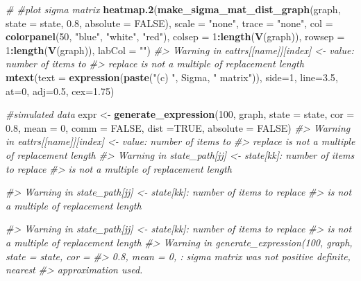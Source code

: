 \documentclass[]{article}
\newenvironment{Shaded}{\begin{snugshade}}{\end{snugshade}}
\newcommand{\CommentTok}[1]{\textcolor[rgb]{0.56,0.35,0.01}{\textit{#1}}}
\newcommand{\DataTypeTok}[1]{\textcolor[rgb]{0.13,0.29,0.53}{#1}}
\newcommand{\DecValTok}[1]{\textcolor[rgb]{0.00,0.00,0.81}{#1}}
\newcommand{\FloatTok}[1]{\textcolor[rgb]{0.00,0.00,0.81}{#1}}
\newcommand{\KeywordTok}[1]{\textcolor[rgb]{0.13,0.29,0.53}{\textbf{#1}}}
\newcommand{\NormalTok}[1]{#1}
\newcommand{\OperatorTok}[1]{\textcolor[rgb]{0.81,0.36,0.00}{\textbf{#1}}}
\newcommand{\OtherTok}[1]{\textcolor[rgb]{0.56,0.35,0.01}{#1}}
\newcommand{\StringTok}[1]{\textcolor[rgb]{0.31,0.60,0.02}{#1}}
\begin{document}
\begin{Shaded}
\begin{Highlighting}[]
{\CommentTok{# #plot sigma matrix}
\KeywordTok{heatmap.2}\NormalTok{(}\KeywordTok{make_sigma_mat_dist_graph}\NormalTok{(graph, }\DataTypeTok{state =}\NormalTok{ state, }\FloatTok{0.8}\NormalTok{, }\DataTypeTok{absolute =} \OtherTok{FALSE}\NormalTok{),}
\DataTypeTok{scale =} \StringTok{"none"}\NormalTok{, }\DataTypeTok{trace =} \StringTok{"none"}\NormalTok{, }\DataTypeTok{col =} \KeywordTok{colorpanel}\NormalTok{(}\DecValTok{50}\NormalTok{, }\StringTok{"blue"}\NormalTok{, }\StringTok{"white"}\NormalTok{, }\StringTok{"red"}\NormalTok{),}
\DataTypeTok{colsep =} \DecValTok{1}\OperatorTok{:}\KeywordTok{length}\NormalTok{(}\KeywordTok{V}\NormalTok{(graph)), }\DataTypeTok{rowsep =} \DecValTok{1}\OperatorTok{:}\KeywordTok{length}\NormalTok{(}\KeywordTok{V}\NormalTok{(graph)), }\DataTypeTok{labCol =} \StringTok{""}\NormalTok{)}
\CommentTok{#> Warning in eattrs[[name]][index] <- value: number of items to}
\CommentTok{#> replace is not a multiple of replacement length}
\KeywordTok{mtext}\NormalTok{(}\DataTypeTok{text =} \KeywordTok{expression}\NormalTok{(}\KeywordTok{paste}\NormalTok{(}\StringTok{"(c) "}\NormalTok{, Sigma, }\StringTok{" matrix"}\NormalTok{)), }\DataTypeTok{side=}\DecValTok{1}\NormalTok{, }\DataTypeTok{line=}\FloatTok{3.5}\NormalTok{, }\DataTypeTok{at=}\DecValTok{0}\NormalTok{, }\DataTypeTok{adj=}\FloatTok{0.5}\NormalTok{, }\DataTypeTok{cex=}\FloatTok{1.75}\NormalTok{)}

\CommentTok{#simulated data}
\NormalTok{expr <-}\StringTok{ }\KeywordTok{generate_expression}\NormalTok{(}\DecValTok{100}\NormalTok{, graph,  }\DataTypeTok{state =}\NormalTok{ state, }\DataTypeTok{cor =} \FloatTok{0.8}\NormalTok{, }\DataTypeTok{mean =} \DecValTok{0}\NormalTok{,}
\DataTypeTok{comm =} \OtherTok{FALSE}\NormalTok{, }\DataTypeTok{dist =}\OtherTok{TRUE}\NormalTok{, }\DataTypeTok{absolute =} \OtherTok{FALSE}\NormalTok{)}
\CommentTok{#> Warning in eattrs[[name]][index] <- value: number of items to}
\CommentTok{#> replace is not a multiple of replacement length}
\CommentTok{#> Warning in state_path[jj] <- state[kk]: number of items to replace}
\CommentTok{#> is not a multiple of replacement length}

\CommentTok{#> Warning in state_path[jj] <- state[kk]: number of items to replace}
\CommentTok{#> is not a multiple of replacement length}

\CommentTok{#> Warning in state_path[jj] <- state[kk]: number of items to replace}
\CommentTok{#> is not a multiple of replacement length}
\CommentTok{#> Warning in generate_expression(100, graph, state = state, cor =}
\CommentTok{#> 0.8, mean = 0, : sigma matrix was not positive definite, nearest}
\CommentTok{#> approximation used.}

}
\end{Highlighting}
\end{Shaded}
\end{document}
